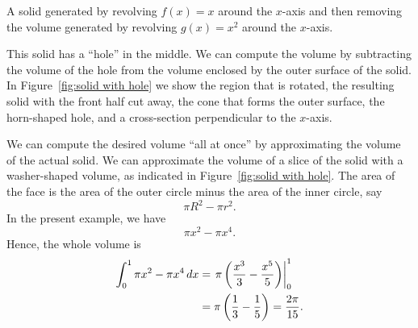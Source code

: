 \begin{marginfigure}
\caption{A solid generated by revolving $f(x) = x$ around the $x$-axis
  and then removing the volume generated by revolving $g(x) = x^2$
  around the $x$-axis.}
\label{fig:solid with hole}
\end{marginfigure}


\begin{solution}
This solid has a ``hole'' in the middle. We can compute the volume by
subtracting the volume of the hole from the volume enclosed by the
outer surface of the solid. In Figure~\ref{fig:solid with hole} we
show the region that is rotated, the resulting solid with the front
half cut away, the cone that forms the outer surface, the horn-shaped
hole, and a cross-section perpendicular to the $x$-axis.

We can compute the desired volume ``all at once'' by approximating the
volume of the actual solid. We can approximate the volume of a slice
of the solid with a washer-shaped volume, as indicated in
Figure~\ref{fig:solid with hole}. The area of the face is the area of
the outer circle minus the area of the inner circle, say
\[
\pi R^2-\pi r^2.
\] 
In the present example, we have
\[
\pi x^2 - \pi x^4. 
\]
Hence, the whole volume is
\begin{align*}
  \int_0^1 \pi x^2-\pi x^4\, d x &= \left.\pi\left({x^3\over3}-{x^5\over5}\right)\right|_0^1\\
&=\pi\left({1\over3}-{1\over5}\right)={2\pi\over15}.
\end{align*}
\end{solution}

